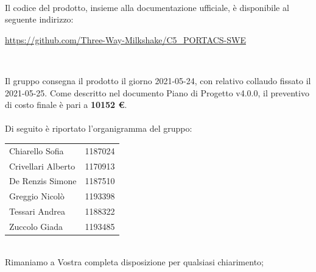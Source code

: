 \documentclass[10pt,stdletter,dateno,sigright]{newlfm}  %
\begin{document}
\begin{newlfm}
        \ \\
        Il codice del prodotto, insieme alla documentazione ufficiale, è disponibile al seguente indirizzo:
		\begin{center}
			\url{https://github.com/Three-Way-Milkshake/C5_PORTACS-SWE}
		\end{center}
		\

         Il gruppo consegna il prodotto il giorno 2021-05-24, con relativo collaudo fissato il 2021-05-25.
         Come descritto nel documento {Piano di Progetto v4.0.0}, il preventivo di costo finale è pari a \textbf{10152 \euro}.
        \\
        \\

        Di seguito \`e riportato l'organigramma del gruppo:
        \begin{center}
            \begin{tabular}{l | l}
                Chiarello Sofia & 1187024
                \\
                Crivellari Alberto & 1170913
                \\
                De Renzis Simone & 1187510
                \\
                Greggio Nicolò & 1193398
                \\
                Tessari Andrea & 1188322
                \\
                Zuccolo Giada & 1193485
                \\
            \end{tabular}
        \end{center}
        \ \newline
        \\Rimaniamo a Vostra completa disposizione per qualsiasi chiarimento;

    \end{newlfm}
\end{document}
